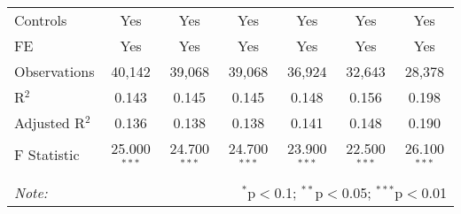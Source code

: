 \begin{table}[!htbp]
\begin{tabular}{@{\extracolsep{5pt}}lcccccc}
Controls & Yes & Yes & Yes & Yes & Yes & Yes \\ 
FE & Yes & Yes & Yes & Yes & Yes & Yes \\ 
Observations & 40,142 & 39,068 & 39,068 & 36,924 & 32,643 & 28,378 \\ 
R$^{2}$ & 0.143 & 0.145 & 0.145 & 0.148 & 0.156 & 0.198 \\ 
Adjusted R$^{2}$ & 0.136 & 0.138 & 0.138 & 0.141 & 0.148 & 0.190 \\ 
F Statistic & 25.000$^{***}$ & 24.700$^{***}$ & 24.700$^{***}$ & 23.900$^{***}$ & 22.500$^{***}$ & 26.100$^{***}$ \\ 
\hline 
\hline \\[-1.8ex] 
\textit{Note:}  & \multicolumn{6}{r}{$^{*}$p$<$0.1; $^{**}$p$<$0.05; $^{***}$p$<$0.01} \\ 
\end{tabular} 
\end{table} 
